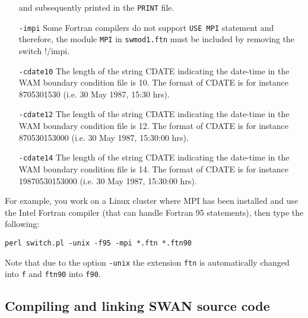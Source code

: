 \documentclass[12pt]{book}
\begin{document}
\begin{itemize}
  and subsequently printed in the {\tt PRINT} file.
  \item[{\tt -impi}]
  Some Fortran compilers do not support {\tt USE MPI} statement and therefore,
  the module {\tt MPI} in {\tt swmod1.ftn} must be included by removing the switch !/impi.
  \item[{\tt -cdate10}]
  The length of the string CDATE indicating the date-time in the WAM boundary condition file is 10.
  The format of CDATE is for instance 8705301530 (i.e. 30 May 1987, 15:30 hrs).
  \item[{\tt -cdate12}]
  The length of the string CDATE indicating the date-time in the WAM boundary condition file is 12.
  The format of CDATE is for instance 870530153000 (i.e. 30 May 1987, 15:30:00 hrs).
  \item[{\tt -cdate14}]
  The length of the string CDATE indicating the date-time in the WAM boundary condition file is 14.
  The format of CDATE is for instance 19870530153000 (i.e. 30 May 1987, 15:30:00 hrs).
\end{itemize}

\noindent
For example, you work on a Linux cluster where MPI has been installed and use the Intel Fortran
compiler (that can handle Fortran 95 statements), then type the following:
\begin{verbatim}
perl switch.pl -unix -f95 -mpi *.ftn *.ftn90
\end{verbatim}
Note that due to the option {\tt -unix} the extension {\tt ftn} is automatically changed into {\tt f}
and {\tt ftn90} into {\tt f90}.

\subsection{Compiling and linking SWAN source code}
\end{document}
